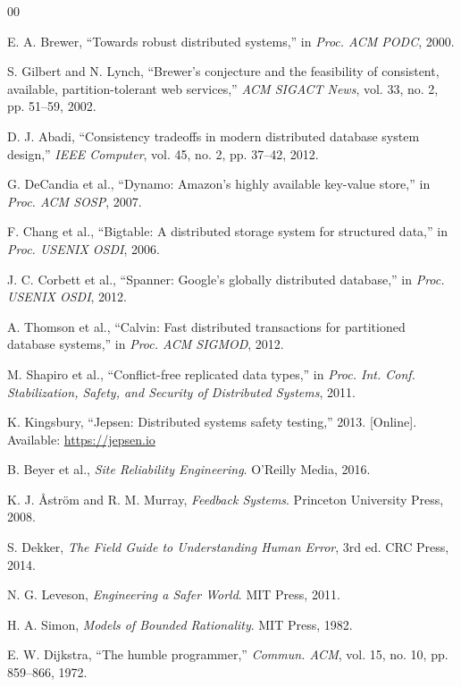 \documentclass[conference]{IEEEtran}
\begin{document}
\begin{thebibliography}{00}

E. A. Brewer, ``Towards robust distributed systems,'' in \textit{Proc. ACM PODC}, 2000.

S. Gilbert and N. Lynch, ``Brewer's conjecture and the feasibility of consistent, available, partition-tolerant web services,'' \textit{ACM SIGACT News}, vol. 33, no. 2, pp. 51--59, 2002.

D. J. Abadi, ``Consistency tradeoffs in modern distributed database system design,'' \textit{IEEE Computer}, vol. 45, no. 2, pp. 37--42, 2012.

G. DeCandia et al., ``Dynamo: Amazon's highly available key-value store,'' in \textit{Proc. ACM SOSP}, 2007.

F. Chang et al., ``Bigtable: A distributed storage system for structured data,'' in \textit{Proc. USENIX OSDI}, 2006.

J. C. Corbett et al., ``Spanner: Google's globally distributed database,'' in \textit{Proc. USENIX OSDI}, 2012.

A. Thomson et al., ``Calvin: Fast distributed transactions for partitioned database systems,'' in \textit{Proc. ACM SIGMOD}, 2012.

M. Shapiro et al., ``Conflict-free replicated data types,'' in \textit{Proc. Int. Conf. Stabilization, Safety, and Security of Distributed Systems}, 2011.

K. Kingsbury, ``Jepsen: Distributed systems safety testing,'' 2013. [Online]. Available: \url{https://jepsen.io}

B. Beyer et al., \textit{Site Reliability Engineering}. O'Reilly Media, 2016.

K. J. \AA{}str\"om and R. M. Murray, \textit{Feedback Systems}. Princeton University Press, 2008.

S. Dekker, \textit{The Field Guide to Understanding Human Error}, 3rd ed. CRC Press, 2014.

N. G. Leveson, \textit{Engineering a Safer World}. MIT Press, 2011.

H. A. Simon, \textit{Models of Bounded Rationality}. MIT Press, 1982.

E. W. Dijkstra, ``The humble programmer,'' \textit{Commun. ACM}, vol. 15, no. 10, pp. 859--866, 1972.


\end{thebibliography}
\end{document}
